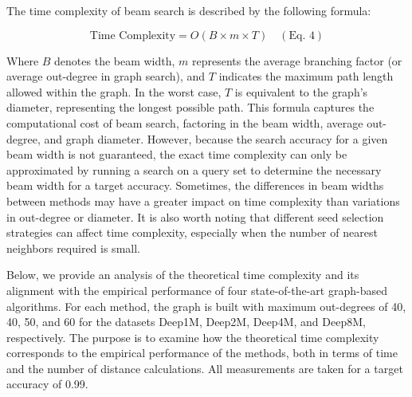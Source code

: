The time complexity of beam search is described by the following formula:

\[
\text{Time Complexity} = O(B \times m \times T) \quad (\text{Eq. 4})
\]

Where \( B \) denotes the beam width, \( m \) represents the average branching factor (or average out-degree in graph search), and \( T \) indicates the maximum path length allowed within the graph. In the worst case, \( T \) is equivalent to the graph's diameter, representing the longest possible path. This formula captures the computational cost of beam search, factoring in the beam width, average out-degree, and graph diameter. However, because the search accuracy for a given beam width is not guaranteed, the exact time complexity can only be approximated by running a search on a query set to determine the necessary beam width for a target accuracy. Sometimes, the differences in beam widths between methods may have a greater impact on time complexity than variations in out-degree or diameter. It is also worth noting that different seed selection strategies can affect time complexity, especially when the number of nearest neighbors required is small.

Below, we provide an analysis of the theoretical time complexity and its alignment with the empirical performance of four state-of-the-art graph-based algorithms. For each method, the graph is built with maximum out-degrees of 40, 40, 50, and 60 for the datasets Deep1M, Deep2M, Deep4M, and Deep8M, respectively. The purpose is to examine how the theoretical time complexity corresponds to the empirical performance of the methods, both in terms of time and the number of distance calculations. All measurements are taken for a target accuracy of 0.99.

